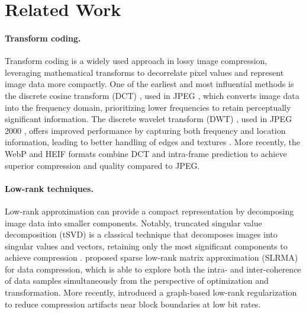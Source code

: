 \section{Related Work} \label{sec: related work}

\paragraph{Transform coding.} 
Transform coding is a widely used approach in lossy image compression, leveraging mathematical transforms to decorrelate pixel values and represent image data more compactly. One of the earliest and most influential methods is the discrete cosine transform (DCT) \cite{ahmed1974discrete}, used in JPEG \cite{wallace1991jpeg}, which converts image data into the frequency domain, prioritizing lower frequencies to retain perceptually significant information. The discrete wavelet transform (DWT) \cite{antonini1992image}, used in JPEG 2000 \cite{skodras2001jpeg}, offers improved performance by capturing both frequency and location information, leading to better handling of edges and textures \cite{shapiro1993embedded}. More recently, the WebP \cite{google2011webp} and HEIF \cite{lainema2016hevc, hannuksela2015high} formats combine DCT and intra-frame prediction to achieve superior compression and quality compared to JPEG.

\paragraph{Low-rank techniques.}
Low-rank approximation can provide a compact representation by decomposing image data into smaller components. Notably, truncated singular value decomposition (tSVD) is a classical technique that decomposes images into singular values and vectors, retaining only the most significant components to achieve compression \cite{andrews1976singular, prasantha2007image}. \citet{hou2015sparse} proposed sparse low-rank matrix approximation (SLRMA) for data compression, which is able to explore both the intra- and inter-coherence of data samples simultaneously from the perspective of optimization and transformation. More recently, \citet{yuan2020image} introduced a graph-based low-rank regularization to reduce compression artifacts near block boundaries at low bit rates.

